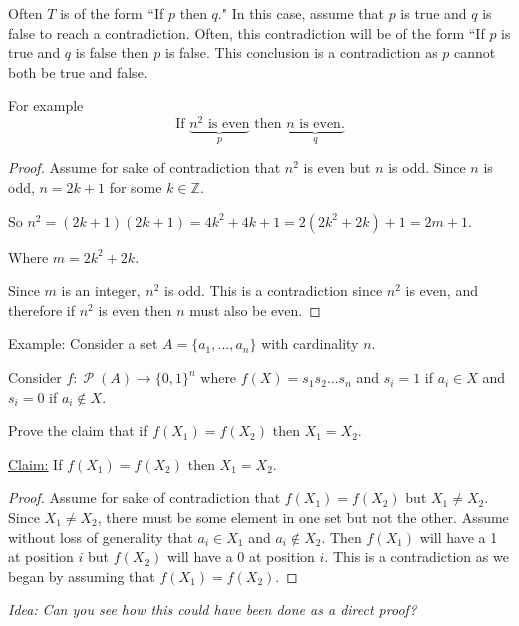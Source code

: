 \documentclass[12pt,letterpaper]{article}
\newcommand{\claim}{\underline{Claim:} }
\newcommand{\idea}{\textit{Idea:} }
\newcommand\Z{\mathbb Z}
\newcommand\Pow{\ensuremath{\operatorname{\mathcal{P}}}}
\begin{document}
    Often $T$ is of the form ``If $p$ then $q$." In this case, assume that $p$ is true and $q$ is false to reach a contradiction. Often, this contradiction will be of the form ``If $p$ is true and $q$ is false then $p$ is false. This conclusion is a contradiction as $p$ cannot both be true and false. 
    
    \begin{mdframed}
    For example 
    $$ \text{If }\underbrace{n^2 \text{ is even}}_{p} \text{ then } \underbrace{n \text{ is even.}}_{q}$$


    \begin{proof} Assume for sake of contradiction that $n^2$ is even but $n$ is odd. Since $n$ is odd, $n = 2k+1$ for some $k \in \Z$.

      So $n^2 = (2k+1)(2k+1) = 4k^2 + 4k + 1 = 2(2k^2 + 2k) + 1 = 2m+1$.

      Where $m =  2k^2 + 2k$.

      Since $m$ is an integer, $n^2$ is odd. This is a contradiction since $n^2$ is even, and therefore if $n^2$ is even then $n$ must also be even.
    \end{proof}
    
    \end{mdframed}
     
     Example: Consider a set $A = \{a_1,...,a_n\}$ with cardinality $n$.
        
    Consider $f: \Pow(A) \rightarrow \{0,1\}^n$ where $f(X) = s_1s_2...s_n$ and $s_i = 1$ if $a_i \in X$ and $s_i = 0$ if $a_i \not\in X$. 
    
    Prove the claim that if $f(X_1) = f(X_2)$ then $X_1 = X_2$. 
    \begin{mdframed}
        
        \claim If $f(X_1) = f(X_2)$ then $X_1 = X_2$. 
                
        \begin{proof}
        Assume for sake of contradiction that $f(X_1) = f(X_2)$ but $X_1 \not= X_2$. Since $X_1 \not= X_2$, there must be some element in one set but not the other. Assume without loss of generality that $a_i \in X_1$ and $a_i \not\in X_2$. Then $f(X_1)$ will have a 1 at position $i$ but $f(X_2)$ will have a 0 at position $i$. This is a contradiction as we began by assuming that $f(X_1) = f(X_2)$. 
        \end{proof}
        
        \idea \textit{Can you see how this could have been done as a direct proof?}
    \end{mdframed}
    
\end{document}
